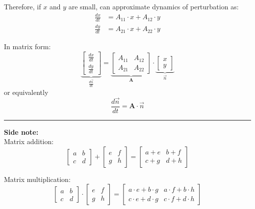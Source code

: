 \documentclass{article}
\begin{document}
Therefore, if $x$ and $y$ are small, can approximate dynamics of perturbation as:
\begin{align*}
	\frac{dx}{dt}&=A_{11} \cdot x + A_{12} \cdot y\\	
	\frac{dy}{dt}&=A_{21} \cdot x + A_{22} \cdot y
\end{align*}

In matrix form:
\begin{equation*}
	\underbrace{\begin{bmatrix}\frac{dx}{dt} \\ \frac{dy}{dt}\end{bmatrix}}_{\frac{d \vec{n}}{dt}} = \underbrace{ \begin{bmatrix}A_{11} & A_{12}\\ A_{21} & A_{22}\end{bmatrix}}_{\mathbf{A}} \cdot \underbrace{\begin{bmatrix}x \\ y\end{bmatrix}}_{\vec{n}}
\end{equation*}
or equivalently
\begin{equation*}
	\frac{d \vec{n}}{dt}= \mathbf{A} \cdot \vec{n}
\end{equation*}

\rule[0.5ex]{\linewidth}{1pt}
\textbf{Side note:}\\
Matrix addition:
\begin{equation*}
 \begin{bmatrix} a & b \\ c & d \end{bmatrix} + \begin{bmatrix} e & f \\ g & h \end{bmatrix} = \begin{bmatrix} a+e & b+f \\ c+g & d+h \end{bmatrix}
\end{equation*}

Matrix multiplication:
\begin{equation*}
 \begin{bmatrix} a & b \\ c & d \end{bmatrix} \cdot \begin{bmatrix} e & f \\ g & h \end{bmatrix} = \begin{bmatrix} a \cdot e + b \cdot g & a \cdot f + b \cdot h \\ c \cdot e + d \cdot g & c \cdot f + d \cdot h \end{bmatrix}
\end{equation*}
\end{document}
